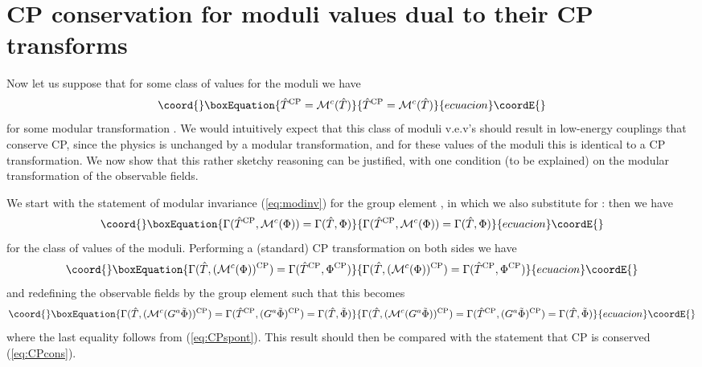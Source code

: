 \documentclass[a4paper,12pt]{article}
\begin{document}
\section{CP conservation for moduli values dual to their CP transforms}
Now let us suppose that for some class \coordHE{} of values for the moduli \coordHE{} we have 
\begin{equation}\coord{}\boxEquation{
	\hat{T}^{\rm CP} = \mathcal{M}^{c}(\hat{T}) \label{eq:modcond}
}{
	\hat{T}^{\rm CP} = \mathcal{M}^{c}(\hat{T}) }{ecuacion}\coordE{}\end{equation}
for some modular transformation \coordHE{}. We would intuitively expect that this class of moduli v.e.v's should result in low-energy couplings that conserve CP, since the physics is unchanged by a modular transformation, and for these values of the moduli this is identical to a CP transformation. We now show that this rather sketchy reasoning can be justified, with one condition (to be explained) on the modular transformation of the observable fields.

We start with the statement of modular invariance (\ref{eq:modinv}) for the group element \coordHE{}, in which we also substitute for \coordHE{}: then we have 
\begin{equation}\coord{}\boxEquation{
\Gamma(\hat{T}^{\rm CP},\mathcal{M}^{c}(\Phi)) = \Gamma(\hat{T},\Phi)
}{
\Gamma(\hat{T}^{\rm CP},\mathcal{M}^{c}(\Phi)) = \Gamma(\hat{T},\Phi)
}{ecuacion}\coordE{}\end{equation}
for the class \coordHE{} of values of the moduli.
Performing a (standard) CP transformation on both sides we have
\begin{equation}\coord{}\boxEquation{
\Gamma(\hat{T},(\mathcal{M}^{c}(\Phi))^{\rm CP}) = \Gamma(\hat{T}^{\rm CP},\Phi^{\rm CP})
}{
\Gamma(\hat{T},(\mathcal{M}^{c}(\Phi))^{\rm CP}) = \Gamma(\hat{T}^{\rm CP},\Phi^{\rm CP})
}{ecuacion}\coordE{}\end{equation}
and redefining the observable fields by the group element \coordHE{} such that \coordHE{} this becomes
\begin{equation}\coord{}\boxEquation{
\Gamma(\hat{T},(\mathcal{M}^{c}(G^a\tilde{\Phi}))^{\rm CP}) = \Gamma(\hat{T}^{\rm CP},(G^a\tilde{\Phi})^{\rm CP}) = \Gamma(\hat{T},\tilde{\Phi})
}{
\Gamma(\hat{T},(\mathcal{M}^{c}(G^a\tilde{\Phi}))^{\rm CP}) = \Gamma(\hat{T}^{\rm CP},(G^a\tilde{\Phi})^{\rm CP}) = \Gamma(\hat{T},\tilde{\Phi})
}{ecuacion}\coordE{}\end{equation}
where the last equality follows from (\ref{eq:CPspont}). This result should then be compared with the statement that CP is conserved (\ref{eq:CPcons}).
\end{document}
